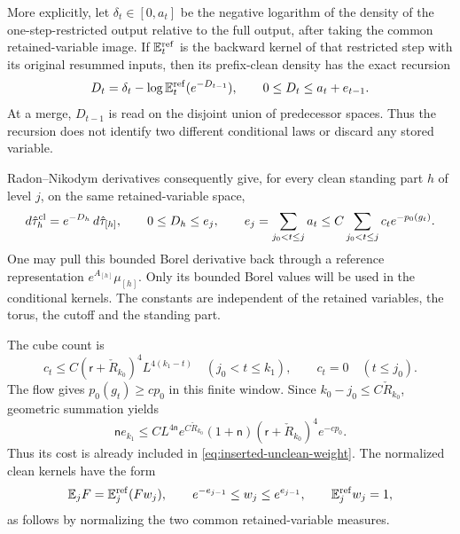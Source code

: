 \documentclass[11pt,letterpaper,reqno]{amsart}
\theoremstyle{definition}
\theoremstyle{remark}
\begin{document}
More explicitly, let \(\delta_t\in[0,a_t]\) be the negative logarithm
of the density of the one-step-restricted output relative to the full
output, after taking the common retained-variable image. If
\(\mathbb E_t^{\rm ref}\) is the backward kernel of that restricted
step with its original resummed inputs, then its prefix-clean density
has the exact recursion
\[
 D_t=\delta_t-\log\mathbb E_t^{\rm ref}(e^{-D_{t-1}}),
 \qquad 0\le D_t\le a_t+e_{t-1}.
\]
At a merge, \(D_{t-1}\) is read on the disjoint union of predecessor
spaces. Thus the recursion does not identify two different
conditional laws or discard any stored variable.

Radon--Nikodym derivatives consequently give, for every clean standing
part \(h\) of level \(j\), on the same retained-variable space,
\begin{equation}\label{eq:inserted-clean-density}
 d\hat\tau_h^{\rm cl}=e^{-D_h}\,d\hat\tau_{[h]},
 \qquad 0\le D_h\le e_j,\qquad
 e_j=\sum_{j_0<t\le j}a_t
       \le C\sum_{j_0<t\le j}c_t e^{-p_0(g_t)}.
\end{equation}
One may pull this bounded Borel derivative back through a reference
representation \(e^{A_{[h]}}\mu_{[h]}\).
Only its bounded Borel values will be used in the conditional kernels.
The constants are independent of the retained variables, the torus,
the cutoff and the standing part.

The cube count is
\[
 c_t\le C(\mathsf r+\check R_{k_0})^4L^{4(k_1-t)}
       \quad(j_0<t\le k_1),\qquad c_t=0\quad(t\le j_0).
\]
The flow gives \(p_0(g_t)\ge cp_0\) in this finite window.
Since \(k_0-j_0\le C\check R_{k_0}\), geometric summation yields
\[
 \mathsf n e_{k_1}
 \le C L^{4\mathsf n}e^{C\check R_{k_0}}(1+\mathsf n)
       (\mathsf r+\check R_{k_0})^4e^{-cp_0}.
\]
Thus its cost is already included in
\eqref{eq:inserted-unclean-weight}. The normalized clean kernels have
the form
\begin{equation}\label{eq:inserted-clean-kernel}
 \mathbb E_jF=\mathbb E_j^{\rm ref}(Fw_j),\qquad
 e^{-e_{j-1}}\le w_j\le e^{e_{j-1}},\qquad
 \mathbb E_j^{\rm ref}w_j=1,
\end{equation}
as follows by normalizing the two common retained-variable measures.
\end{document}
